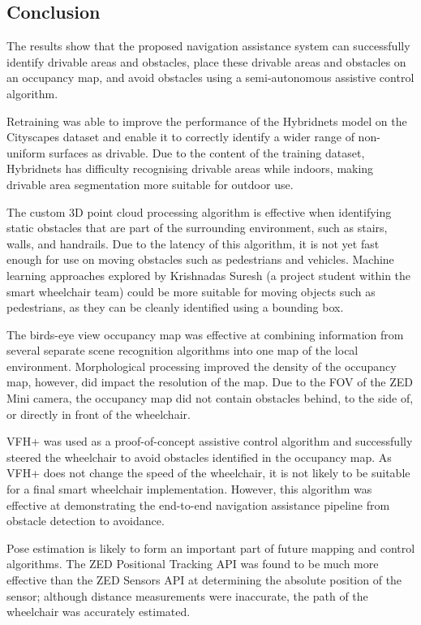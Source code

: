 \subsection{Conclusion}
The results show that the proposed navigation assistance system
can successfully identify drivable areas and obstacles,
place these drivable areas and obstacles on an occupancy map, and avoid obstacles
using a semi-autonomous assistive control algorithm.

Retraining was able to improve the performance of the Hybridnets model on the Cityscapes dataset
and enable it to correctly identify a wider range of non-uniform surfaces as drivable.
Due to the content of the training dataset, Hybridnets has difficulty
recognising drivable areas while indoors, making drivable area segmentation
more suitable for outdoor use.

The custom 3D point cloud processing algorithm is effective when identifying static
obstacles that are part of the surrounding environment, such as stairs, walls,
and handrails. Due to the latency of this algorithm, it is not yet fast enough
for use on moving obstacles such as pedestrians and vehicles.
Machine learning approaches explored by Krishnadas Suresh
(a project student within the smart wheelchair team) could be more suitable
for moving objects such as pedestrians, as they can be cleanly identified using
a bounding box.

The birds-eye view occupancy map was effective at combining information
from several separate scene recognition algorithms into one
map of the local environment. Morphological processing improved the density of the occupancy map, however, did impact the resolution
of the map. Due to the FOV of the ZED Mini camera, the occupancy map
did not contain obstacles behind, to the side of, or directly in front
of the wheelchair.

VFH+ was used as a proof-of-concept assistive control algorithm and successfully
steered the wheelchair to avoid obstacles identified in the occupancy map. As VFH+ does not change
the speed of the wheelchair, it is not likely to be suitable for a final smart wheelchair
implementation. However, this algorithm was effective at demonstrating the end-to-end
navigation assistance pipeline from obstacle detection to avoidance.

Pose estimation is likely to form an important part of future mapping and control algorithms.
The ZED Positional Tracking API was found to be much more effective
than the ZED Sensors API at determining the absolute position of the
sensor; although distance measurements were inaccurate,
the path of the wheelchair was accurately estimated.

